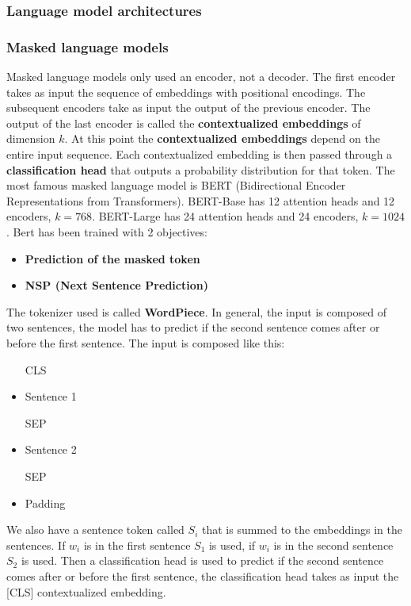 \subsubsection{Language model architectures}
\label{subsubsec:language_model_architectures}

\subsubsection{Masked language models}

Masked language models only used an encoder, not a decoder.
The first encoder takes as input the sequence of embeddings with
positional encodings. The subsequent encoders take as input the output of the previous encoder.
The output of the last encoder is called the \textbf{contextualized embeddings} of dimension $k$.
At this point the \textbf{contextualized embeddings} depend on the entire input sequence.
Each contextualized embedding is then passed through a \textbf{classification head}
that outputs a probability distribution for that token.
The most famous masked language model is BERT (Bidirectional Encoder Representations from Transformers).
BERT-Base has 12 attention heads and 12 encoders, $k=768$.
BERT-Large has 24 attention heads and 24 encoders, $k=1024$.
Bert has been trained with 2 objectives:
\begin{itemize}
    \item \textbf{Prediction of the masked token}
    \item \textbf{NSP (Next Sentence Prediction)}
\end{itemize}
The tokenizer used is called \textbf{WordPiece}.
In general, the input is composed of two sentences, the model has to predict if the second sentence
comes after or before the first sentence.
The input is composed like this:
\begin{itemize}
    \item [CLS]
    \item Sentence 1
    \item [SEP]
    \item Sentence 2
    \item [SEP]
    \item Padding
\end{itemize}
We also have a sentence token called $S_i$ that is summed to the embeddings in the sentences.
If $w_i$ is in the first sentence $S_1$ is used, if $w_i$ is in the second sentence $S_2$ is used.
Then a classification head is used to predict if the second sentence comes after or before the first sentence,
the classification head takes as input the [CLS] contextualized embedding.

